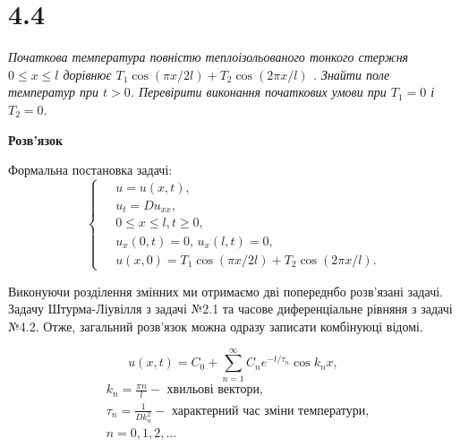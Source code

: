 

%


\section[Задача №4.4]{4.4}

\textit{Початкова температура повністю теплоізольованого тонкого стержня\\ $0 \leq x \leq l$ дорівнює $T_1 \cos(\pi x/2l) + T_2 \cos(2\pi x/l)$ . Знайти поле температур при $t > 0$. Перевірити виконання початкових умови при $T_1 = 0$ і $T_2 = 0$.}

\begin{center}
    \large{\textbf{Розв'язок}}
\end{center}

\noindent Формальна постановка задачі:
\begin{equation} \label{probcond8}
    \left\{ \begin{aligned} %
            \;&u = u(x,t), \\
            &u_t = D u_{xx}, \\
            &0 \leq x \leq l, t \geq 0, \\
            &u_x(0,t) = 0, \, u_x(l,t) = 0,\\ 
            &u(x,0) = T_1 \cos(\pi x/2l) + T_2 \cos(2\pi x/l).
    \end{aligned} \right.
\end{equation}

Виконуючи розділення змінних ми отримаємо дві попереднбо розв'язані задачі. Задачу Штурма-Ліувілля з задачі №2.1 та часове диференціальне рівняня з задачі №4.2. Отже, загальний розв'язок можна одразу записати комбінуюці відомі.

\begin{equation} \label{gen-sol8}
    u(x,t) = C_0 + \sum_{n=1}^{\infty}C_n e^{-t/\tau_n} \cos k_n x,
\end{equation}
\begin{equation*}
    \begin{aligned}
        &k_n = \frac{\pi n}{l} - \text{ хвильові вектори}, \\
        &\tau_n = \frac{1}{D k_n^2} - \text{ характерний час зміни температури}, \\
        &n = 0, 1, 2,\ldots
    \end{aligned}
\end{equation*}

